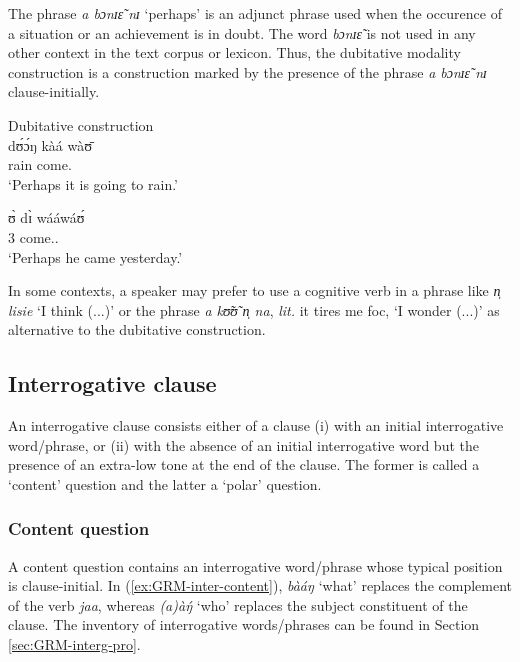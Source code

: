 The phrase {\it a bɔnɪɛ̃ nɪ} `perhaps' is an adjunct phrase used when the
occurence of a situation  or an achievement  is in doubt. The word {\it bɔnɪɛ̃}
is not
used in any other context in the text corpus or lexicon. Thus, the dubitative
modality construction is a construction marked by the presence of the phrase
{\it a bɔnɪɛ̃ nɪ} clause-initially.



\ea
\label{ex:GRM-modal}{\rm Dubitative construction}\\

\ea
\label{ex:GRM-modal-45.5}
  dʊ́ɔ́ŋ kàá wàʊ̄\\
{\dub} rain {\fut} come.{\foc}\\
\glt  `Perhaps it is going to rain.'


\ex
\label{ex:GRM-modal-45.3}
   ʊ̀ dɪ̀ wááwáʊ́\\
{\dub}  {3\sg} {\hest} come.{\pfv.\foc}\\
\glt `Perhaps he came yesterday.'

\z
\z



In some contexts, a speaker may prefer  to use a cognitive verb in a phrase
like {\it n̩ lisie} `I think (...)'  or
the phrase {\it a kʊ̃ʊ̃ n̩ na}, {\it lit.} it tires me {\sc foc},  `I wonder
(...)' as alternative to the dubitative
construction. 



\subsection{Interrogative clause}
\label{sec:GRM-interr-clause}

An interrogative clause consists either of a clause (i) with an initial
interrogative word/phrase, or (ii) with the absence of an initial interrogative
word but the presence of an extra-low tone at the end of the clause. The former
is called a `content' question and the latter a `polar' question. 

\subsubsection{Content question}
\label{sec:GRM-interr-content}

A content question contains an interrogative word/phrase whose typical position
is clause-initial. In (\ref{ex:GRM-inter-content}), {\it bàáŋ} `what' 
replaces
the complement of the verb {\it jaa}, whereas {\it (a)àŋ́} `who'  replaces
the subject constituent of the clause. The inventory of interrogative
words/phrases can
be found in Section \ref{sec:GRM-interg-pro}.

